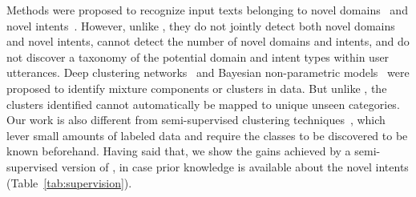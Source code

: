 
Methods were proposed to recognize input texts belonging to novel domains~\cite{kim2018joint} and novel intents~\cite{lin2019deep,vedula2019towards}. However, unlike \mname{}, they do not jointly detect both novel domains and novel intents, cannot detect the number of novel domains and intents, and do not discover a taxonomy of the potential domain and intent types within user utterances. %
Deep clustering networks~\cite{hsu2015neural} and Bayesian non-parametric models~\cite{dundar2012bayesian,akova2012self} were proposed to identify mixture components or clusters in data. But unlike \mname{}, the clusters identified cannot automatically be mapped to unique unseen categories. 
Our work %
is also different from semi-supervised clustering techniques~\cite{fu2016semi,akova2012self,yi2015efficient,yi2013semi,hsu2015neural}, which lever small amounts of labeled data and require the classes to be discovered to be known beforehand. Having said that, we show the gains achieved by a semi-supervised version of \mname{}, in case prior knowledge is available about the novel intents (Table~\ref{tab:supervision}).